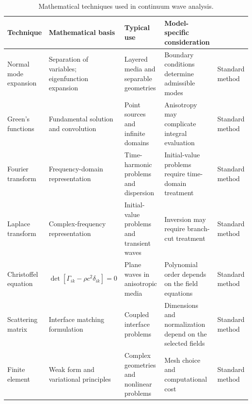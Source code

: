 \begin{table}[htbp]
\centering
\small
\setlength{\tabcolsep}{3pt}
\caption{Mathematical techniques used in continuum wave analysis.}
\label{tab:T5-techniques}
\begin{tabularx}{\textwidth}{@{}p{2.4cm}YYYY@{}}
\toprule
\textbf{Technique} & \textbf{Mathematical basis} & \textbf{Typical use} & \textbf{Model-specific consideration} & \textbf{} \\
\midrule
Normal mode expansion & Separation of variables; eigenfunction expansion & Layered media and separable geometries & Boundary conditions determine admissible modes & Standard method \\
Green's functions & Fundamental solution and convolution & Point sources and infinite domains & Anisotropy may complicate integral evaluation & Standard method \\
Fourier transform & Frequency-domain representation & Time-harmonic problems and dispersion & Initial-value problems require time-domain treatment & Standard method \\
Laplace transform & Complex-frequency representation & Initial-value problems and transient waves & Inversion may require branch-cut treatment & Standard method \\
Christoffel equation & $\det[\Gamma_{ik}-\rho c^2\delta_{ik}]=0$ & Plane waves in anisotropic media & Polynomial order depends on the field equations & Standard method \\
Scattering matrix & Interface matching formulation & Coupled interface problems & Dimensions and normalization depend on the selected fields & Standard method \\
Finite element & Weak form and variational principles & Complex geometries and nonlinear problems & Mesh choice and computational cost & Standard method \\
\bottomrule
\end{tabularx}
\par{}
\end{table}
